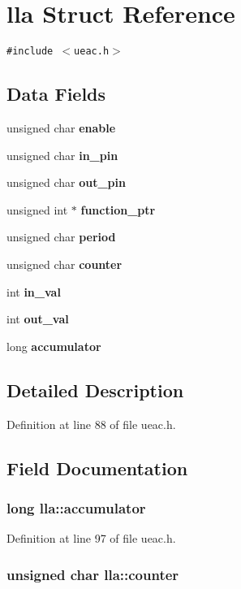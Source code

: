 \section{lla Struct Reference}
\label{structlla}
{\tt \#include $<$ueac.h$>$}

\subsection*{Data Fields}
\begin{CompactItemize}
\item 
unsigned char {\bf enable}
\item 
unsigned char {\bf in\_\-pin}
\item 
unsigned char {\bf out\_\-pin}
\item 
unsigned int $\ast$ {\bf function\_\-ptr}
\item 
unsigned char {\bf period}
\item 
unsigned char {\bf counter}
\item 
int {\bf in\_\-val}
\item 
int {\bf out\_\-val}
\item 
long {\bf accumulator}
\end{CompactItemize}


\subsection{Detailed Description}




Definition at line 88 of file ueac.h.

\subsection{Field Documentation}
\subsubsection{\setlength{\rightskip}{0pt plus 5cm}long {\bf lla::accumulator}}\label{structlla_o8}




Definition at line 97 of file ueac.h.
\subsubsection{\setlength{\rightskip}{0pt plus 5cm}unsigned char {\bf lla::counter}}\label{structlla_o5}




